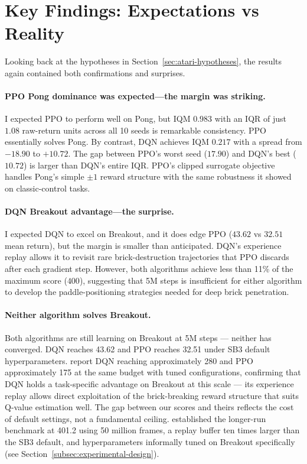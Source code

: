 \section{Key Findings: Expectations vs Reality}
\label{sec:atari-key-findings}

Looking back at the hypotheses in Section~\ref{sec:atari-hypotheses},
the results again contained both confirmations and surprises.

\paragraph{PPO Pong dominance was expected---the margin was striking.}
I expected PPO to perform well on Pong, but IQM $0.983$ with an IQR
of just $1.08$ raw-return units across all 10 seeds is remarkable
consistency. PPO essentially solves Pong. By contrast, DQN achieves
IQM $0.217$ with a spread from $-18.90$ to $+10.72$. The gap between
PPO's worst seed ($17.90$) and DQN's best ($10.72$) is larger than
DQN's entire IQR. PPO's clipped surrogate objective handles Pong's
simple $\pm1$ reward structure with the same robustness it showed on
classic-control tasks.

\paragraph{DQN Breakout advantage---the surprise.}
I expected DQN to excel on Breakout, and it does edge PPO ($43.62$
vs $32.51$ mean return), but the margin is smaller than anticipated.
DQN's experience replay allows it to revisit rare brick-destruction
trajectories that PPO discards after each gradient step. However,
both algorithms achieve less than 11\% of the maximum score ($400$),
suggesting that 5M steps is insufficient for either algorithm to
develop the paddle-positioning strategies needed for deep brick
penetration.

\paragraph{Neither algorithm solves Breakout.}
{\color{red} Both algorithms are still learning on Breakout at 5M steps --- neither has converged. DQN reaches 43.62 and PPO reaches 32.51 under SB3 default hyperparameters. \citet{defuente2024comparative} report DQN reaching approximately 280 and PPO approximately 175 at the same budget with tuned configurations, confirming that DQN holds a task-specific advantage on Breakout at this scale --- its experience replay allows direct exploitation of the brick-breaking reward structure that suits Q-value estimation well. The gap between our scores and theirs reflects the cost of default settings, not a fundamental ceiling. \citet{mnih2015human} established the longer-run benchmark at 401.2 using 50 million frames, a replay buffer ten times larger than the SB3 default, and hyperparameters informally tuned on Breakout specifically (see Section~\ref{subsec:experimental-design}).}

